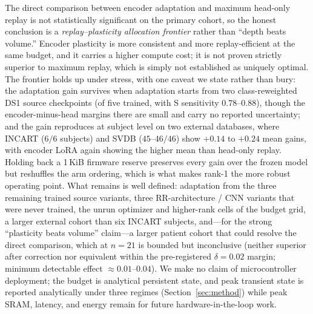 The direct comparison between encoder adaptation and maximum head-only replay is
not statistically significant on the primary cohort, so the honest conclusion is
a \emph{replay--plasticity allocation frontier} rather than ``depth beats
volume.'' Encoder plasticity is more consistent and more replay-efficient at the
same budget, and it carries a higher compute cost; it is not proven strictly
superior to maximum replay, which is simply not established as uniquely optimal.
The frontier holds up under stress, with one caveat we state rather than bury:
the adaptation gain survives when adaptation starts from two class-reweighted
DS1 source checkpoints (of five trained, with S sensitivity $0.78$--$0.88$),
though the encoder-minus-head margins there are small and carry no reported
uncertainty; and the gain reproduces at subject level on two external databases,
where INCART ($6/6$ subjects) and SVDB ($45$--$46/46$) show $+0.14$ to $+0.24$
mean gains, with encoder LoRA again showing the higher mean than head-only
replay. Holding back a
1\,KiB firmware reserve preserves every gain over the frozen model but reshuffles
the arm ordering, which is what makes rank-1 the more robust operating point. What remains is well defined: adaptation from the three
remaining trained source variants, three RR-architecture / CNN variants that were
never trained, the unrun optimizer and higher-rank cells of the budget grid, a
larger external cohort than six INCART subjects, and---for the strong
``plasticity beats volume'' claim---a larger patient cohort that could resolve the
direct comparison, which at $n = 21$ is bounded but inconclusive (neither
superior after correction nor equivalent within the pre-registered
$\delta = 0.02$ margin; minimum detectable effect $\approx 0.01$--$0.04$).
We make no claim of microcontroller deployment; the budget is
analytical persistent state, and peak transient state is reported analytically
under three regimes (Section~\ref{sec:method}) while peak SRAM, latency, and
energy remain for future hardware-in-the-loop work.
